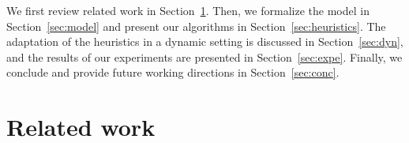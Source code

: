 \documentclass[conference]{IEEEtran}
\newcommand{\skug}[1]{{\color{blue}[SK: #1]}}
\begin{document}
We first review related work in Section~\ref{sec:related-work}. Then, we formalize the model in Section~\ref{sec:model}
and present our algorithms in Section~\ref{sec:heuristics}. The adaptation of the heuristics in a dynamic setting is discussed in Section~\ref{sec:dyn}, and the results of our experiments are presented in Section~\ref{sec:expe}. Finally, we conclude
and provide future working directions in Section~\ref{sec:conc}.  




\section{Related work} %
\label{sec:related-work}

\end{document}
